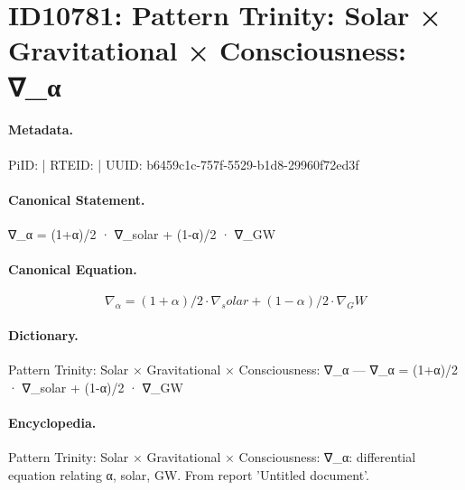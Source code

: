 \section*{ID10781: Pattern Trinity: Solar × Gravitational × Consciousness: ∇\_α}
\paragraph{Metadata.}
PiID:  | RTEID:  | UUID: b6459c1c-757f-5529-b1d8-29960f72ed3f

\paragraph{Canonical Statement.}
∇\_α = (1+α)/2 · ∇\_solar + (1-α)/2 · ∇\_GW

\paragraph{Canonical Equation.}
\[
∇_α = (1+α)/2 · ∇_solar + (1-α)/2 · ∇_GW
\]

\paragraph{Dictionary.}
Pattern Trinity: Solar × Gravitational × Consciousness: ∇\_α — ∇\_α = (1+α)/2 · ∇\_solar + (1-α)/2 · ∇\_GW

\paragraph{Encyclopedia.}
Pattern Trinity: Solar × Gravitational × Consciousness: ∇\_α: differential equation relating α, solar, GW. From report 'Untitled document'.
